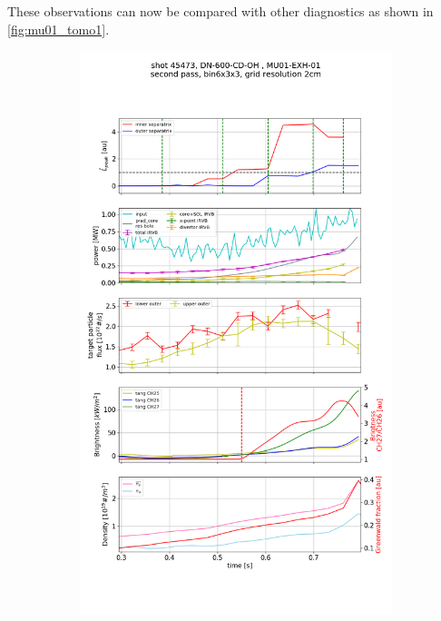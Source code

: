 These observations can now be compared with other diagnostics %
as shown in \autoref{fig:mu01_tomo1}.
\begin{figure}
     \centering
     \begin{subfigure}{0.8\linewidth}
         \centering
         \includegraphics[trim={0 960 0 150},clip,width=\textwidth]{Chapters/chapter2/figs/IRVB-MASTU_shot-45473_pass1_bin6x3x3_gridres2cm_all_variables_absolute_small3.png}

\end{subfigure}
\end{figure}
